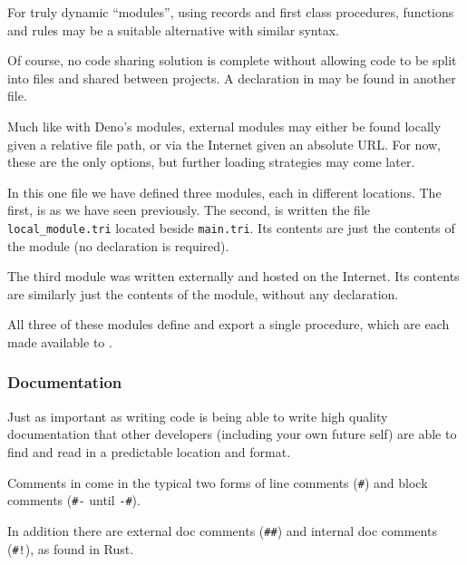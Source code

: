 For truly dynamic ``modules'', using records and first class procedures,
functions and rules may be a suitable alternative with similar syntax.

Of course, no code sharing solution is complete without allowing code
to be split into files and shared between projects. A  declaration
in \Trilogy{} may be found in another file.

Much like with Deno's modules, external modules may either be found locally
given a relative file path, or via the Internet given an absolute URL\@. For
now, these are the only options, but further loading strategies may come
later.


In this one file we have defined three modules, each in different locations.
The first,  is as we have seen previously. The second,
 is written the file \texttt{local\_module.tri} located
beside \texttt{main.tri}. Its contents are just the contents of the module
(no  declaration is required).


The third module was written externally and hosted on the Internet.
Its contents are similarly just the contents of the module, without
any declaration.


All three of these modules define and export a single procedure, which
are each made available to .

\subsubsection{Documentation}

Just as important as writing code is being able to write high quality
documentation that other developers (including your own future self)
are able to find and read in a predictable location and format.

Comments in \Trilogy{} come in the typical two forms of line comments
(\texttt{\#}) and block comments (\texttt{\#-} until \texttt{-\#}).

In addition there are external doc comments (\texttt{\#\#}) and internal
doc comments (\texttt{\#!}), as found in Rust.


